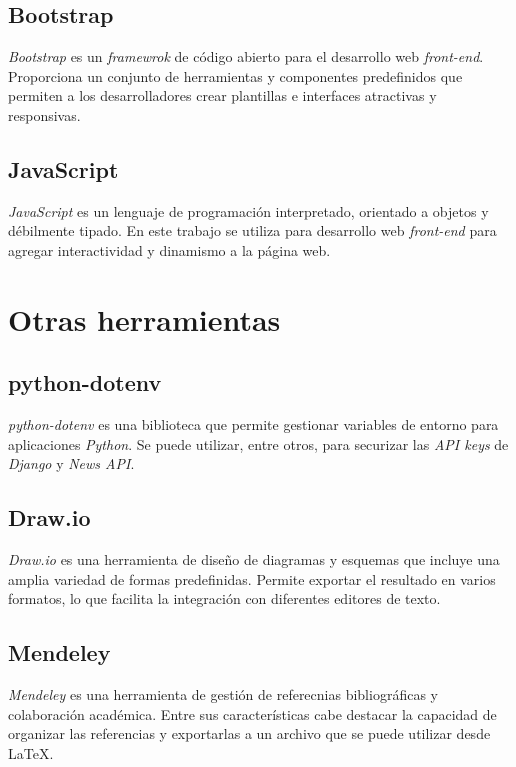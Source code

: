 \subsection{Bootstrap}\label{bootstrap}

\emph{Bootstrap} \citep{online:bootstrap} es un \emph{framewrok} de código abierto para el desarrollo web \emph{front-end}. Proporciona un conjunto de herramientas y componentes predefinidos que permiten a los desarrolladores crear plantillas e interfaces atractivas y responsivas. 

\subsection{JavaScript}\label{javascript}

\emph{JavaScript} \citep{wiki:javascript} es un lenguaje de programación interpretado, orientado a objetos y débilmente tipado. En este trabajo se utiliza para desarrollo web \emph{front-end} para agregar 
interactividad y dinamismo a la página web. 


\section{Otras herramientas}\label{otras_herramientas}

\subsection{python-dotenv}\label{python-dotenv}

\emph{python-dotenv} \citep{online:dotenv} es una biblioteca que permite gestionar variables de entorno para aplicaciones \emph{Python}. Se puede utilizar, entre otros, para securizar las \emph{API keys} de \emph{Django} y \emph{News API}. 

\subsection{Draw.io}\label{draw_io}

\emph{Draw.io} \citep{online:drawio} es una herramienta de diseño de diagramas y esquemas que incluye una amplia variedad de formas predefinidas. Permite exportar el resultado en varios formatos, lo que facilita la integración con diferentes editores de texto. 

\subsection{Mendeley}\label{mendeley}

\emph{Mendeley} \citep{online:mendeley} es una herramienta de gestión de referecnias bibliográficas y colaboración académica. Entre sus características cabe destacar la capacidad de organizar las referencias y exportarlas a un archivo que se puede utilizar desde \LaTeX. 
